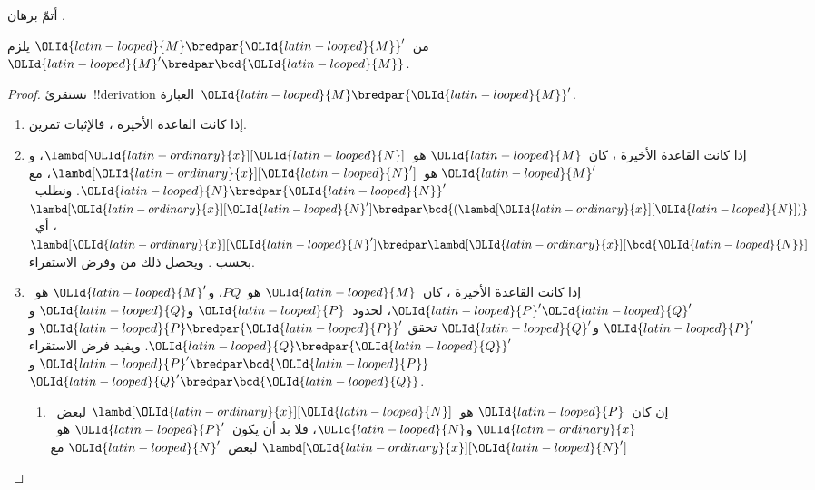 \documentclass[../../../include/open-logic-section]{subfiles}
\begin{document}
\begin{prob}
  أتمّ برهان .
\end{prob}

\begin{lem}
  من~${\OLId{latin-looped}{M}} \bredpar {\OLId{latin-looped}{M}}'$ يلزم~${\OLId{latin-looped}{M}}' \bredpar \bcd{{\OLId{latin-looped}{M}}}$.
\end{lem}
\begin{proof}
  نستقرئ~!!{derivation} العبارة~${\OLId{latin-looped}{M}} \bredpar {\OLId{latin-looped}{M}}'$.
  \begin{enumerate}
    \item إذا كانت القاعدة الأخيرة ، فالإثبات تمرين.
    \item إذا كانت القاعدة الأخيرة ، كان~${\OLId{latin-looped}{M}}$
      هو~$\lambd[{\OLId{latin-ordinary}{x}}][{\OLId{latin-looped}{N}}]$، و${\OLId{latin-looped}{M}}'$ هو~$\lambd[{\OLId{latin-ordinary}{x}}][{\OLId{latin-looped}{N}}']$، مع
      ${\OLId{latin-looped}{N}} \bredpar {\OLId{latin-looped}{N}}'$. ونطلب~$\lambd[{\OLId{latin-ordinary}{x}}][{\OLId{latin-looped}{N}}'] \bredpar
      \bcd{(\lambd[{\OLId{latin-ordinary}{x}}][{\OLId{latin-looped}{N}}])}$، أي~$\lambd[{\OLId{latin-ordinary}{x}}][{\OLId{latin-looped}{N}}'] \bredpar
      \lambd[{\OLId{latin-ordinary}{x}}][\bcd{{\OLId{latin-looped}{N}}}]$ بحسب .
      ويحصل ذلك من  وفرض الاستقراء.
    \item إذا كانت القاعدة الأخيرة ، كان~${\OLId{latin-looped}{M}}$ هو~$PQ$،
      و${\OLId{latin-looped}{M}}'$ هو~${\OLId{latin-looped}{P}}'{\OLId{latin-looped}{Q}}'$، لحدود~${\OLId{latin-looped}{P}}$ و${\OLId{latin-looped}{Q}}$ و${\OLId{latin-looped}{P}}'$ و${\OLId{latin-looped}{Q}}'$ تحقق
      ${\OLId{latin-looped}{P}} \bredpar {\OLId{latin-looped}{P}}'$ و${\OLId{latin-looped}{Q}} \bredpar {\OLId{latin-looped}{Q}}'$. ويفيد فرض الاستقراء
      ${\OLId{latin-looped}{P}}' \bredpar \bcd{{\OLId{latin-looped}{P}}}$ و${\OLId{latin-looped}{Q}}' \bredpar \bcd{{\OLId{latin-looped}{Q}}}$.
      \begin{enumerate}
        \item إن كان~${\OLId{latin-looped}{P}}$ هو~$\lambd[{\OLId{latin-ordinary}{x}}][{\OLId{latin-looped}{N}}]$ لبعض~${\OLId{latin-ordinary}{x}}$ و${\OLId{latin-looped}{N}}$،
          فلا بد أن يكون~${\OLId{latin-looped}{P}}'$ هو~$\lambd[{\OLId{latin-ordinary}{x}}][{\OLId{latin-looped}{N}}']$ لبعض~${\OLId{latin-looped}{N}}'$ مع

\end{enumerate}
\end{enumerate}
\end{proof}
\end{document}
